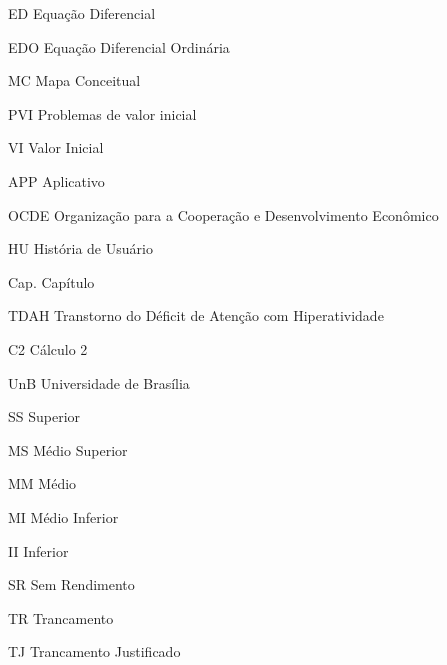 \begin{siglas}
  \item[ED] Equação Diferencial
  \item[EDO] Equação Diferencial Ordinária
  \item[MC] Mapa Conceitual
  \item[PVI] Problemas de valor inicial
  \item[VI] Valor Inicial
  \item[APP] Aplicativo
  \item[OCDE] Organização para a Cooperação e Desenvolvimento Econômico
  \item[HU] História de Usuário
  \item[Cap.] Capítulo
  \item[TDAH] Transtorno do Déficit de Atenção com Hiperatividade 
  \item[C2] Cálculo 2
  \item[UnB] Universidade de Brasília
  \item[SS] Superior  
  \item[MS] Médio Superior
  \item[MM] Médio 
  \item[MI] Médio Inferior
  \item[II] Inferior  
  \item[SR] Sem Rendimento 
  \item[TR] Trancamento
  \item[TJ] Trancamento Justificado 
\end{siglas}
